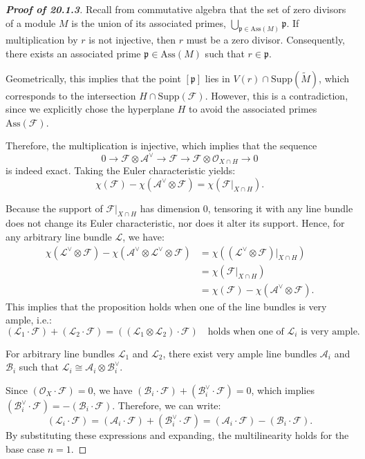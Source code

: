 \begin{proof}[\textbf{Proof of 20.1.3}]
Recall from commutative algebra that the set of zero divisors of a module $M$ is the union of its associated primes, $\bigcup_{\mathfrak{p} \in \text{Ass}(M)} \mathfrak{p}$. If multiplication by $r$ is not injective, then $r$ must be a zero divisor. Consequently, there exists an associated prime $\mathfrak{p} \in \text{Ass}(M)$ such that $r \in \mathfrak{p}$.

Geometrically, this implies that the point $[\mathfrak{p}]$ lies in $V(r) \cap \text{Supp}(\widetilde{M})$, which corresponds to the intersection $H \cap \text{Supp}(\mathcal{F})$. However, this is a contradiction, since we explicitly chose the hyperplane $H$ to avoid the associated primes $\text{Ass}(\mathcal{F})$.



Therefore, the multiplication is injective, which implies that the sequence
\[
0 \longrightarrow \mathcal{F} \otimes \mathcal{A}^\vee \longrightarrow \mathcal{F} \longrightarrow \mathcal{F} \otimes \mathcal{O}_{X \cap H} \longrightarrow 0
\]
is indeed exact. Taking the Euler characteristic yields:
\[
\chi(\mathcal{F}) - \chi(\mathcal{A}^\vee \otimes \mathcal{F}) = \chi(\mathcal{F}|_{X \cap H}).
\]

Because the support of $\mathcal{F}|_{X \cap H}$ has dimension 0, tensoring it with any line bundle does not change its Euler characteristic, nor does it alter its support. Hence, for any arbitrary line bundle $\mathcal{L}$, we have:
\begin{align*}
\chi(\mathcal{L}^\vee \otimes \mathcal{F}) - \chi(\mathcal{A}^\vee \otimes \mathcal{L}^\vee \otimes \mathcal{F}) &= \chi((\mathcal{L}^\vee \otimes \mathcal{F})|_{X \cap H}) \\
&= \chi(\mathcal{F}|_{X \cap H}) \\
&= \chi(\mathcal{F}) - \chi(\mathcal{A}^\vee \otimes \mathcal{F}).
\end{align*}
This implies that the proposition holds when one of the line bundles is very ample, i.e.:
\[
(\mathcal{L}_1\cdot\mathcal{F}) + (\mathcal{L}_2\cdot\mathcal{F}) = ((\mathcal{L}_1 \otimes \mathcal{L}_2) \cdot \mathcal{F}) \quad \text{holds when one of $\mathcal{L}_i$ is very ample.}
\]

For arbitrary line bundles $\mathcal{L}_1$ and $\mathcal{L}_2$, there exist very ample line bundles $\mathcal{A}_i$ and $\mathcal{B}_i$ such that $\mathcal{L}_i \cong \mathcal{A}_i \otimes \mathcal{B}_i^\vee$.

Since $(\mathcal{O}_X \cdot \mathcal{F}) = 0$, we have $(\mathcal{B}_i \cdot \mathcal{F}) + (\mathcal{B}_i^\vee \cdot \mathcal{F}) = 0$, which implies $(\mathcal{B}_i^\vee \cdot \mathcal{F}) = -(\mathcal{B}_i \cdot \mathcal{F})$. 
Therefore, we can write:
\[
(\mathcal{L}_i \cdot \mathcal{F}) = (\mathcal{A}_i \cdot \mathcal{F}) + (\mathcal{B}_i^\vee \cdot \mathcal{F}) = (\mathcal{A}_i \cdot \mathcal{F}) - (\mathcal{B}_i \cdot \mathcal{F}).
\]
By substituting these expressions and expanding, the multilinearity holds for the base case $n=1$.




\end{proof}
